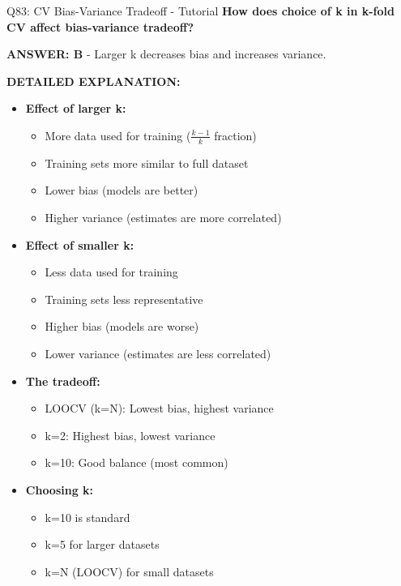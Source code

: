 \documentclass[8pt]{beamer}
\begin{document}
	\begin{frame}{Q83: CV Bias-Variance Tradeoff - Tutorial}
		\fontsize{6.5}{7.5}\selectfont
		\textbf{How does choice of k in k-fold CV affect bias-variance tradeoff?}
		
		\vspace{0.05cm}
		\textcolor{myblue}{\textbf{ANSWER: B}} - Larger k decreases bias and increases variance.
		
		\vspace{0.05cm}
		\textbf{DETAILED EXPLANATION:}
		\begin{itemize}
			\item \textbf{Effect of larger k:}
			\begin{itemize}
				\item More data used for training ($\frac{k-1}{k}$ fraction)
				\item Training sets more similar to full dataset
				\item Lower bias (models are better)
				\item Higher variance (estimates are more correlated)
			\end{itemize}
			\item \textbf{Effect of smaller k:}
			\begin{itemize}
				\item Less data used for training
				\item Training sets less representative
				\item Higher bias (models are worse)
				\item Lower variance (estimates are less correlated)
			\end{itemize}
			\item \textbf{The tradeoff:}
			\begin{itemize}
				\item LOOCV (k=N): Lowest bias, highest variance
				\item k=2: Highest bias, lowest variance
				\item k=10: Good balance (most common)
			\end{itemize}
			\item \textbf{Choosing k:}
			\begin{itemize}
				\item k=10 is standard
				\item k=5 for larger datasets
				\item k=N (LOOCV) for small datasets
			\end{itemize}
		\end{itemize}
		

\end{frame}
\end{document}
